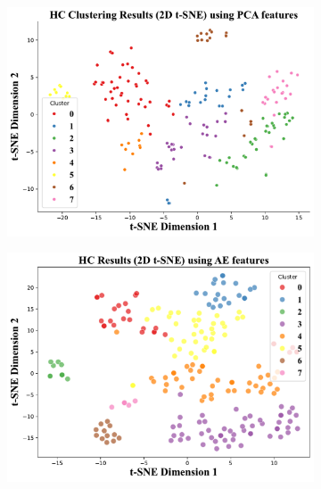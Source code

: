 \documentclass{article} %
\begin{document}
\begin{figure}[!t]
\begin{subfigure}{.24\textwidth}
        \vspace{-5pt}
        \label{fig:visual2}
    \end{subfigure}
    \hfill %
    \begin{subfigure}{.24\textwidth}
        \centering
        \includegraphics[width=1.0\linewidth]{./figures/PCA_hc_tsne_2d.pdf}
        \vspace{-5pt}
        \label{fig:visual3}
    \end{subfigure}
    \hfill %
    \begin{subfigure}{.24\textwidth}
        \centering
        \includegraphics[width=1.0\linewidth]{./figures/AE_hc_tsne_2d.pdf}
        \vspace{-5pt}
        \label{fig:visual4}
    \end{subfigure}
 

\end{figure}
\end{document}

